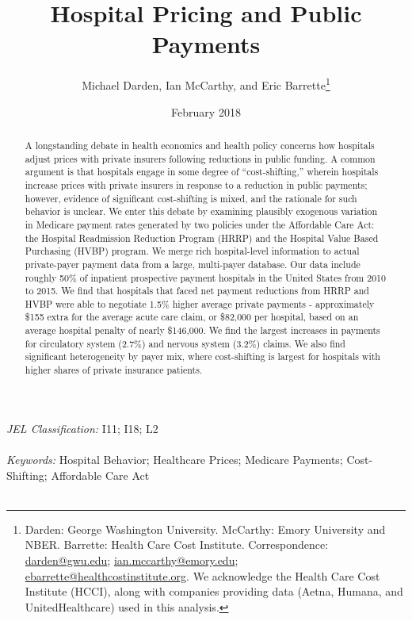 \documentclass[12pt]{article}
\begin{document}
\title{Hospital Pricing and Public Payments}
\author{%
  Michael Darden, Ian McCarthy, and Eric Barrette\thanks{Darden: George Washington University. McCarthy: Emory University and NBER. Barrette: Health Care Cost Institute.  Correspondence: \href{mailto:darden@gwu.edu}{darden@gwu.edu}; \href{mailto:ian.mccarthy@emory.edu}{ian.mccarthy@emory.edu}; \href{mailto:ebarrette@healthcostinstitute.org}{ebarrette@healthcostinstitute.org}. We acknowledge the Health Care Cost Institute (HCCI), along with companies providing data (Aetna, Humana, and UnitedHealthcare) used in this analysis.}
}
\date{February 2018}

\maketitle

\begin{abstract}
A longstanding debate in health economics and health policy concerns how hospitals adjust prices with private insurers following reductions in public funding. A common argument is that hospitals engage in some degree of ``cost-shifting,'' wherein hospitals increase prices with private insurers in response to a reduction in public payments; however, evidence of significant cost-shifting is mixed, and the rationale for such behavior is unclear.  We enter this debate by examining plausibly exogenous variation in Medicare payment rates generated by two policies under the Affordable Care Act: the Hospital Readmission Reduction Program (HRRP) and the Hospital Value Based Purchasing (HVBP) program.  We merge rich hospital-level information to actual private-payer payment data from a large, multi-payer database. Our data include roughly 50\% of inpatient prospective payment hospitals in the United States from 2010 to 2015. We find that hospitals that faced net payment reductions from HRRP and HVBP were able to negotiate 1.5\% higher average private payments - approximately \$155 extra for the average acute care claim, or \$82,000 per hospital, based on an average hospital penalty of nearly \$146,000. We find the largest increases in payments for circulatory system (2.7\%) and nervous system (3.2\%) claims.  We also find significant heterogeneity by payer mix, where cost-shifting is largest for hospitals with higher shares of private insurance patients.
\end{abstract}
\noindent \textit{JEL Classification:} I11; I18; L2 \\\\
\noindent \textit{Keywords:} Hospital Behavior; Healthcare Prices; Medicare Payments; Cost-Shifting; Affordable Care Act\\\\
\end{document}
